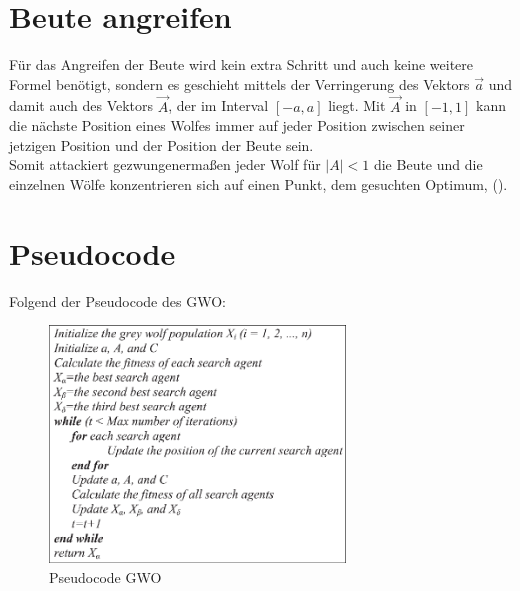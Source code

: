 \section{Beute angreifen}
Für das Angreifen der Beute wird kein extra Schritt und auch keine weitere Formel benötigt, sondern es geschieht mittels der Verringerung des Vektors $\vec{a}$ und damit auch des Vektors $\vec{A}$, der im Interval $[-a, a]$ liegt. Mit $\vec{A}$ in $[-1, 1]$ kann die nächste Position eines Wolfes immer auf jeder Position zwischen seiner jetzigen Position und der Position der Beute sein. \\
Somit attackiert gezwungenermaßen jeder Wolf für $|A| < 1$ die Beute und die einzelnen Wölfe konzentrieren sich auf einen Punkt, dem gesuchten Optimum, (\cite[vgl. Mirjalili 2014, S.8]{MIRJALILI201446}). 
\section{Pseudocode}
Folgend der Pseudocode des GWO:
\begin{figure}[ht]
    \begin{center}
        \includegraphics[width=0.7\textwidth]{assets/img/Pseudo-code-of-Grey-Wolf-Optimization-GWO-algorithm.png}
        \caption[Pseudocode GWO]{Pseudocode GWO \cite{MIRJALILI201446}}
        \label{gwo_pseudocode}
    \end{center}
\end{figure}